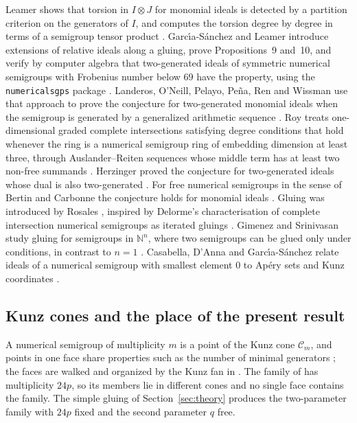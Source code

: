 \documentclass[11pt]{article}
\theoremstyle{definition}
\theoremstyle{remark}
\newcommand{\N}{\mathbb{N}}
\begin{document}
Leamer shows that torsion in $I\otimes J$ for monomial ideals is detected by a partition criterion on the
generators of $I$, and computes the torsion degree by degree in terms of a semigroup tensor product
\cite{Leamer2012}. Garc\'{\i}a-S\'anchez and Leamer introduce extensions of relative ideals along a gluing, prove
Propositions~9 and~10, and verify by computer algebra that two-generated ideals of symmetric numerical semigroups
with Frobenius number below $69$ have the property, using the \texttt{numericalsgps} package
\cite{GarciaSanchezLeamer2013,DelgadoGarciaSanchezMorais}. Landeros, O'Neill, Pelayo, Pe\~na, Ren and Wissman use that
approach to prove the conjecture for two-generated monomial ideals when the semigroup is generated by a generalized
arithmetic sequence \cite{Landeros2024}. Roy treats one-dimensional graded complete intersections satisfying degree conditions that hold whenever the ring is a numerical semigroup ring of embedding dimension at least
three, through Auslander--Reiten sequences whose middle term has at least two non-free summands \cite{Roy2018}. Herzinger
proved the conjecture for two-generated ideals whose dual is also two-generated
\cite{Herzinger1999}. For free numerical semigroups in the sense of Bertin and Carbonne \cite{BertinCarbonne1977}
the conjecture holds for monomial ideals \cite{GarciaSanchezLeamer2013}. Gluing was introduced by Rosales \cite[Chapter~8]{RosalesGarciaSanchez2009}, inspired by Delorme's characterisation of complete intersection
numerical semigroups as iterated gluings \cite{Delorme1976}. Gimenez and Srinivasan study gluing for semigroups in
$\N^n$, where two semigroups can be glued only under conditions, in contrast to $n=1$ \cite{GimenezSrinivasan2022}.
Casabella, D'Anna and Garc\'{\i}a-S\'anchez relate ideals of a numerical semigroup with smallest element $0$ to
Ap\'ery sets and Kunz coordinates \cite{CasabellaDAnnaGarciaSanchez2023}.

\subsection{Kunz cones and the place of the present result}

A numerical semigroup of multiplicity $m$ is a point of the Kunz cone $\mathcal C_m$, and points in one face
share properties such as the number of minimal generators \cite{Borevitz2023}; the faces are walked and organized
by the Kunz fan in \cite{BrowerMcDonoughONeill2024}. The family of \cite{SantibanezLeal2026} has multiplicity
$24p$, so its members lie in different cones and no single face contains the family. The simple gluing of
Section~\ref{sec:theory} produces the two-parameter family with $24p$ fixed and the second parameter $q$ free.
\end{document}
